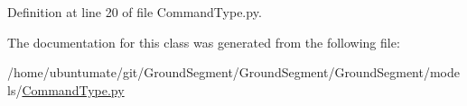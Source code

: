 Definition at line 20 of file Command\+Type.\+py.



The documentation for this class was generated from the following file\+:\begin{DoxyCompactItemize}
\item 
/home/ubuntumate/git/\+Ground\+Segment/\+Ground\+Segment/\+Ground\+Segment/models/\hyperlink{_command_type_8py}{Command\+Type.\+py}\end{DoxyCompactItemize}
